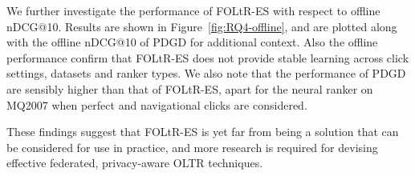 We further investigate the performance of FOLtR-ES with respect to offline nDCG@10. Results are shown in Figure~\ref{fig:RQ4-offline}, and are plotted along with the offline nDCG@10 of PDGD for additional context. Also the offline performance confirm that FOLtR-ES does not provide stable learning across click settings, datasets and ranker types. We also note that the performance of PDGD are sensibly higher than that of FOLtR-ES, apart for the neural ranker on MQ2007 when perfect and navigational clicks are considered. 

These findings suggest that FOLtR-ES is yet far from being a solution that can be considered for use in practice, and more research is required for devising effective federated, privacy-aware OLTR techniques.